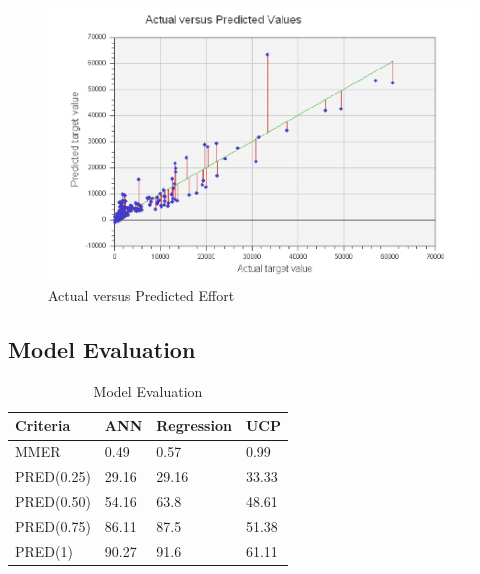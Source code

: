 \documentclass[8pt]{article}
\begin{document}
{{{\begin{figure}[tbp]
\begin{center}
\includegraphics[natwidth=500,natheight=250]{Sources/Images/3.png}
\caption{Actual versus Predicted Effort}
\label{fig3}
\end{center}
\end{figure}

\subsection{Model Evaluation}
\label{sub6b}
\vspace{0.5cm}
\begin{table}[h]
\small
\centering
\caption{Model Evaluation}
\vspace{0.5cm}
\label{table5}
\centering
\begin{tabular}{|p{1.65cm}|p{1cm}|p{1.35cm}|p{1cm}|}
\hline
Criteria & ANN & Regression & UCP\\
\hline
MMER & 0.49 & 0.57 & 0.99\\
\hline
PRED(0.25) & 29.16 & 29.16 & 33.33\\
\hline
PRED(0.50) & 54.16 & 63.8 & 48.61\\
\hline
PRED(0.75) & 86.11 & 87.5 & 51.38\\
\hline
PRED(1) & 90.27 & 91.6 & 61.11\\
\hline
\end{tabular}
\end{table}

}}}
\end{document}
